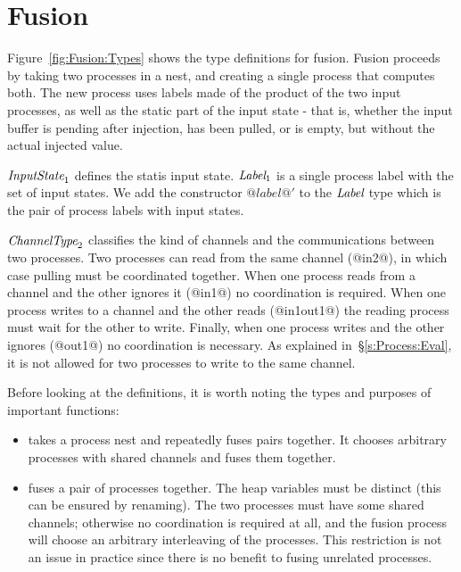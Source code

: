 \section{Fusion}
\label{s:Fusion}




Figure~\ref{fig:Fusion:Types} shows the type definitions for fusion.
Fusion proceeds by taking two processes in a nest, and creating a single process that computes both.
The new process uses labels made of the product of the two input processes, as well as the static part of the input state - that is, whether the input buffer is pending after injection, has been pulled, or is empty, but without the actual injected value.


$\textit{InputState}_1$ defines the statis input state. $\textit{Label}_1$ is a single process label with the set of input states. We add the constructor $@label@'$ to the $\textit{Label}$ type which is the pair of process labels with input states.

$\textit{ChannelType}_2$ classifies the kind of channels and the communications between two processes.
Two processes can read from the same channel (@in2@), in which case pulling must be coordinated together.
When one process reads from a channel and the other ignores it (@in1@) no coordination is required.
When one process writes to a channel and the other reads (@in1out1@) the reading process must wait for the other to write.
Finally, when one process writes and the other ignores (@out1@) no coordination is necessary.
As explained in~\S\ref{s:Process:Eval}, it is not allowed for two processes to write to the same channel.

Before looking at the definitions, it is worth noting the types and purposes of important functions:
\begin{itemize}
\item
{} takes a process nest and repeatedly fuses pairs together. 
It chooses arbitrary processes with shared channels and fuses them together.

\item
{} fuses a pair of processes together.
The heap variables must be distinct (this can be ensured by renaming).
The two processes must have some shared channels; otherwise no coordination is required at all, and the fusion process will choose an arbitrary interleaving of the processes.
This restriction is not an issue in practice since there is no benefit to fusing unrelated processes.
\end{itemize}

